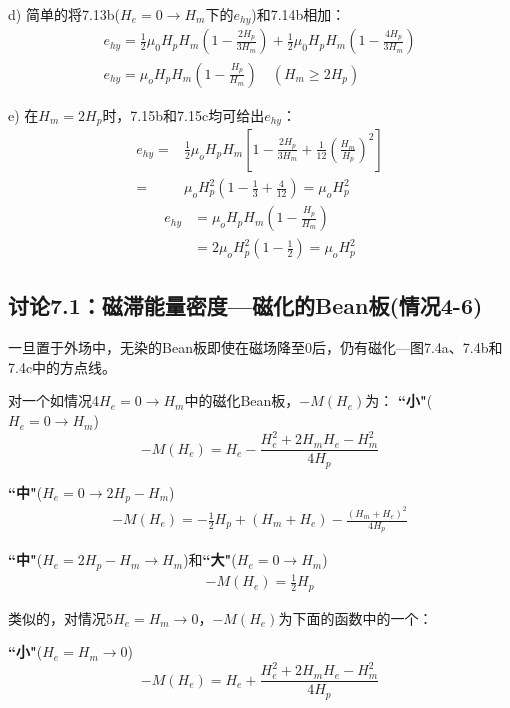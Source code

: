 d) 简单的将7.13b($H_e=0\rightarrow H_m$下的$e_{hy}$)和7.14b相加：
\begin{align*}%
e_{hy}=\frac{1}{2}\mu_0 H_p H_m\left(1-\frac{2H_p}{3H_m}\right)+\frac{1}{2}\mu_0 H_p H_m\left(1-\frac{4H_p}{3H_m}\right)\\
e_{hy}=\mu_oH_pH_m\left(1-\frac{H_p}{H_m}\right) \quad   (H_m\geq 2H_p) \tag{7.15c}
\end{align*}

e) 在$H_m=2H_p$时，7.15b和7.15c均可给出$e_{hy}$：
\begin{align*}%
e_{hy}=&\frac{1}{2}\mu_oH_pH_m\left[1-\frac{2H_p}{3H_m}+\frac{1}{12}\left(\frac{H_m}{H_p}\right)^2\right]\\\tag{7.15b}
=&\mu_oH_{p}^{2}\left(1-\frac{1}{3}+\frac{4}{12}\right)=\mu_oH_{p}^{2}
\end{align*}
\begin{align*}%
e_{hy}&=\mu_oH_pH_m\left(1-\frac{H_p}{H_m}\right) \\\tag{7.15c}
&=2\mu_oH_{p}^{2}\left(1-\frac{1}{2}\right)=\mu_oH_{p}^{2}
\end{align*}

\subsection{讨论7.1：磁滞能量密度---磁化的Bean板(情况4-6)}
一旦置于外场中，无染的Bean板即使在磁场降至0后，仍有磁化---图7.4a、7.4b和7.4c中的方点线。

对一个如情况4$H_e=0\rightarrow H_m$中的磁化Bean板，$-M(H_e)$为：
\textbf{``小"}($H_e=0\rightarrow H_m$)
\begin{equation}%
-M(H_e)=H_e-\frac{H_{e}^{2}+2H_mH_e-H_{m}^{2}}{4H_p}
\end{equation}

\textbf{``中"}($H_e=0\rightarrow 2H_p-H_m$)
\begin{align*}%
-M(H_e)=-\frac{1}{2}H_p+(H_m+H_e)-\frac{(H_m+H_e)^2}{4H_p} \tag{7.17b}
\end{align*}

\textbf{``中"}($H_e=2H_p-H_m\rightarrow H_m$)和\textbf{``大"}($H_e=0\rightarrow H_m$)
\begin{align*}%
-M(H_e)=\frac{1}{2}H_p \tag{5.6}
\end{align*}

类似的，对情况5$H_e=H_m\rightarrow 0$，$-M(H_e)$为下面的函数中的一个：

\textbf{``小"}($H_e=H_m\rightarrow 0$)
\begin{equation}%
-M(H_e)=H_e+\frac{H_{e}^{2}+2H_mH_e-H_{m}^{2}}{4H_p}
\end{equation}

